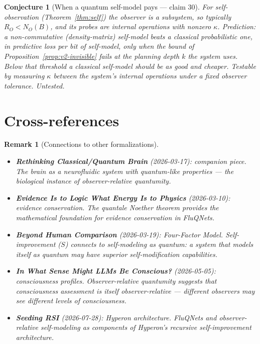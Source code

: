 \documentclass[11pt,a4paper]{article}
\newtheorem{conjecture}[definition]{Conjecture}
\newtheorem{remark}[definition]{Remark}
\begin{document}
\begin{conjecture}[When a quantum self-model pays --- claim 30]
\label{conj:v2-selfmodel}
For self-observation (Theorem~\ref{thm:self}) the observer is a subsystem, so
typically $R_O<N_O(B)$, and its probes are internal operations with nonzero
$\kappa$. Prediction: a non-commutative (density-matrix) self-model beats a
classical probabilistic one, in predictive loss per bit of self-model, only
when the bound of Proposition~\ref{prop:v2-invisible} fails at the planning
depth $k$ the system uses. Below that threshold a classical self-model should
be as good and cheaper. Testable by measuring $\kappa$ between the system's
internal operations under a fixed observer tolerance. Untested.
\end{conjecture}

\section{Cross-references}

\begin{remark}[Connections to other formalizations]
\begin{itemize}
\item \textbf{Rethinking Classical/Quantum Brain} (2026-03-17):
  companion piece. The brain as a neurofluidic system with quantum-like
  properties --- the biological instance of observer-relative quantumity.
\item \textbf{Evidence Is to Logic What Energy Is to Physics} (2026-03-10):
  evidence conservation. The quantale Noether theorem provides the
  mathematical foundation for evidence conservation in FluQNets.
\item \textbf{Beyond Human Comparison} (2026-03-19): Four-Factor Model.
  Self-improvement ($S$) connects to self-modeling as quantum: a system
  that models itself as quantum may have superior self-modification
  capabilities.
\item \textbf{In What Sense Might LLMs Be Conscious?} (2026-05-05):
  consciousness profiles. Observer-relative quantumity suggests that
  consciousness assessment is itself observer-relative --- different
  observers may see different levels of consciousness.
\item \textbf{Seeding RSI} (2026-07-28): Hyperon architecture.
  FluQNets and observer-relative self-modeling as components of
  Hyperon's recursive self-improvement architecture.
\end{itemize}
\end{remark}
\end{document}
